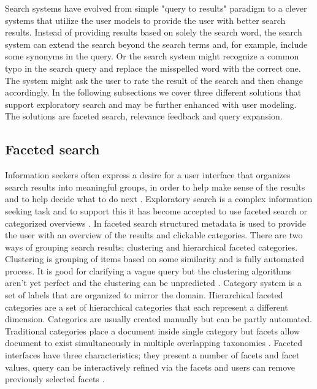 \documentclass{sigchi}
\begin{document}
Search systems have evolved from simple "query to results" paradigm to a clever systems that utilize the user models to provide the user with better search results. Instead of providing results based on solely the search word, the search system can extend the search beyond the search terms and, for example, include some synonyms in the query. Or the search system might recognize a common typo in the search query and replace the misspelled word with the correct one. The system might ask the user to rate the result of the search and then change accordingly. In the following subsections we cover three different solutions that support exploratory search and may be further enhanced with user modeling. The solutions are faceted search, relevance feedback and query expansion.

\subsection{Faceted search}

Information seekers often express a desire for a user interface that organizes search results into meaningful groups, in order to help make sense of the results and to help decide what to do next \cite{hearst06}. Exploratory search is a complex information seeking task and to support this it has become accepted to use faceted search or categorized overviews \cite{kules09}. In faceted search structured metadata is used to provide the user with an overview of the results and clickable categories. There are two ways of grouping search results; clustering and hierarchical faceted categories. Clustering is grouping of items based on some similarity and is fully automated process. It is good for clarifying a vague query but the clustering algorithms aren't yet perfect and the clustering can be unpredicted \cite{hearst06}. Category system is a set of labels that are organized to mirror the domain. Hierarchical faceted categories are a set of hierarchical categories that each represent a different dimension. Categories are usually created manually but can be partly automated. Traditional categories place a document inside single category but facets allow document to exist simultaneously in multiple overlapping taxonomies \cite{koren08}. Faceted interfaces have three characteristics; they present a number of facets and facet values, query can be interactively refined via the facets and users can remove previously selected facets \cite{koren08}. 
\end{document}

